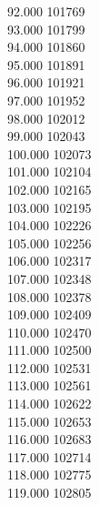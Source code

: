 { 92.000	101769 \\
 93.000	101799 \\
 94.000	101860 \\
 95.000	101891 \\
 96.000	101921 \\
 97.000	101952 \\
 98.000	102012 \\
 99.000	102043 \\
 100.000	102073 \\
 101.000	102104 \\
 102.000	102165 \\
 103.000	102195 \\
 104.000	102226 \\
 105.000	102256 \\
 106.000	102317 \\
 107.000	102348 \\
 108.000	102378 \\
 109.000	102409 \\
 110.000	102470 \\
 111.000	102500 \\
 112.000	102531 \\
 113.000	102561 \\
 114.000	102622 \\
 115.000	102653 \\
 116.000	102683 \\
 117.000	102714 \\
 118.000	102775 \\
 119.000	102805 \\
}
